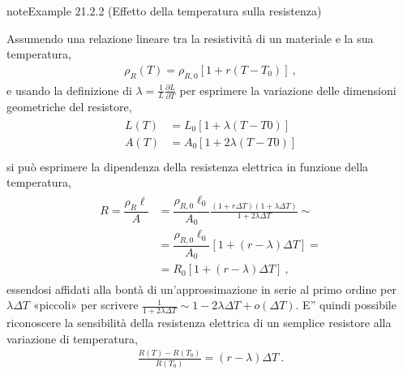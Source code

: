 \documentclass[letterpaper,10pt,italian]{jupyterBook}
\begin{document}
\begin{sphinxadmonition}{note}{Example 21.2.2 (Effetto della temperatura sulla resistenza)}



\sphinxAtStartPar
Assumendo una relazione lineare tra la resistività di un materiale e la sua temperatura,
\begin{equation*}
\begin{split}\rho_R(T) = \rho_{R,0} \left[ 1 + r (T - T_0) \right] \ ,\end{split}
\end{equation*}
\sphinxAtStartPar
e usando la definizione di {\hyperref[\detokenize{ch/thermodynamics/elastic-solid-1d:physics-hs-thermodynamics-matter-elastic-1d-dilation}]{}} \(\lambda = \frac{1}{L}\frac{\partial L}{\partial T}\) per esprimere la variazione delle dimensioni geometriche del resistore,
\begin{equation*}
\begin{split}\begin{aligned}
  L(T) & = L_0 \left[ 1 + \lambda   (T-T0) \right] \\
  A(T) & = A_0 \left[ 1 + 2 \lambda (T-T0) \right] \\
\end{aligned}\end{split}
\end{equation*}
\sphinxAtStartPar
si può esprimere la dipendenza della resistenza elettrica in funzione della temperatura,
\begin{equation*}
\begin{split}\begin{aligned}
 R = \dfrac{\rho_R \ell}{A} 
 & = \dfrac{\rho_{R,0} \ell_0}{A_0} \frac{\left( 1 + r \Delta T\right)\left( 1 + \lambda \Delta T \right)}{1 + 2 \lambda \Delta T} \sim \\
 & = \dfrac{\rho_{R,0} \ell_0}{A_0} \left[ 1 + \left( r - \lambda \right) \Delta T \right] = \\
 & = R_0 \left[ 1 + \left( r - \lambda \right) \Delta T \right] \ ,
\end{aligned}\end{split}
\end{equation*}
\sphinxAtStartPar
essendosi affidati alla bontà di un’approssimazione in serie al primo ordine per \(\lambda \Delta T\) «piccoli» per scrivere \(\frac{1}{1 + 2 \lambda \Delta T} \sim 1 - 2 \lambda \Delta T + o(\Delta T)\). E” quindi possibile riconoscere la sensibilità della resistenza elettrica di un semplice resistore alla variazione di temperatura,
\begin{equation*}
\begin{split}\frac{R(T)- R(T_0)}{R(T_0)} = (r - \lambda) \Delta T \ .\end{split}
\end{equation*}\end{sphinxadmonition}
\end{document}
